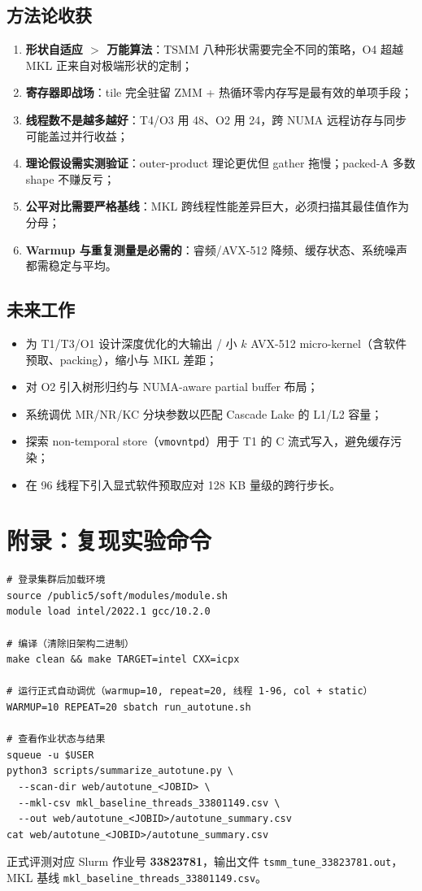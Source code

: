 \documentclass[11pt,a4paper,fontset=fandol]{ctexart}
\begin{document}
\subsection{方法论收获}
\begin{enumerate}[leftmargin=2.4em]
  \item \textbf{形状自适应 $>$ 万能算法}：TSMM 八种形状需要完全不同的策略，O4 超越 MKL 正来自对极端形状的定制；
  \item \textbf{寄存器即战场}：tile 完全驻留 ZMM + 热循环零内存写是最有效的单项手段；
  \item \textbf{线程数不是越多越好}：T4/O3 用 48、O2 用 24，跨 NUMA 远程访存与同步可能盖过并行收益；
  \item \textbf{理论假设需实测验证}：outer-product 理论更优但 gather 拖慢；packed-A 多数 shape 不赚反亏；
  \item \textbf{公平对比需要严格基线}：MKL 跨线程性能差异巨大，必须扫描其最佳值作为分母；
  \item \textbf{Warmup 与重复测量是必需的}：睿频/AVX-512 降频、缓存状态、系统噪声都需稳定与平均。
\end{enumerate}

\subsection{未来工作}
\begin{itemize}[leftmargin=2.4em]
  \item 为 T1/T3/O1 设计深度优化的大输出 / 小 $k$ AVX-512 micro-kernel（含软件预取、packing），缩小与 MKL 差距；
  \item 对 O2 引入树形归约与 NUMA-aware partial buffer 布局；
  \item 系统调优 MR/NR/KC 分块参数以匹配 Cascade Lake 的 L1/L2 容量；
  \item 探索 non-temporal store（\texttt{vmovntpd}）用于 T1 的 C 流式写入，避免缓存污染；
  \item 在 96 线程下引入显式软件预取应对 128 KB 量级的跨行步长。
\end{itemize}

\section*{附录：复现实验命令}
\begin{lstlisting}[style=bashstyle]
# 登录集群后加载环境
source /public5/soft/modules/module.sh
module load intel/2022.1 gcc/10.2.0

# 编译（清除旧架构二进制）
make clean && make TARGET=intel CXX=icpx

# 运行正式自动调优（warmup=10, repeat=20, 线程 1-96, col + static）
WARMUP=10 REPEAT=20 sbatch run_autotune.sh

# 查看作业状态与结果
squeue -u $USER
python3 scripts/summarize_autotune.py \
  --scan-dir web/autotune_<JOBID> \
  --mkl-csv mkl_baseline_threads_33801149.csv \
  --out web/autotune_<JOBID>/autotune_summary.csv
cat web/autotune_<JOBID>/autotune_summary.csv
\end{lstlisting}
正式评测对应 Slurm 作业号 \textbf{33823781}，输出文件 \texttt{tsmm\_tune\_33823781.out}，MKL 基线 \texttt{mkl\_baseline\_threads\_33801149.csv}。
\end{document}
